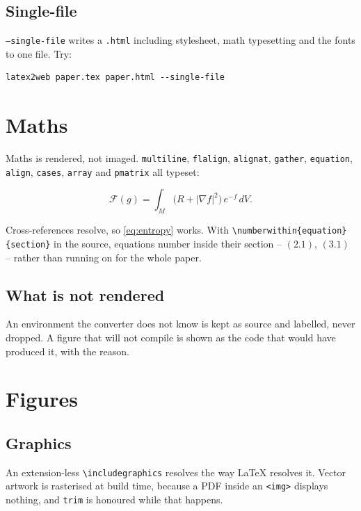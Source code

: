 \documentclass[11pt]{article}
\begin{document}
\subsection{Single-file}

\texttt{--single-file} writes a \texttt{.html} including stylesheet, math
typesetting and the fonts to one file. Try:

\begin{verbatim}
latex2web paper.tex paper.html --single-file
\end{verbatim}

\section{Maths}

Maths is rendered, not imaged. \texttt{multiline}, \texttt{flalign},
\texttt{alignat}, \texttt{gather}, \texttt{equation}, \texttt{align},
\texttt{cases}, \texttt{array} and \texttt{pmatrix} all typeset:

\begin{equation}\label{eq:entropy}
  \mathcal{F}(g) = \int_M \bigl(R + |\nabla f|^2\bigr)\,e^{-f}\,dV.
\end{equation}

Cross-references resolve, so \eqref{eq:entropy} works. With
\verb|\numberwithin{equation}{section}| in the source, equations number inside
their section -- $(2.1)$, $(3.1)$ -- rather than running on for the whole paper.

\subsection{What is not rendered}

An environment the converter does not know is kept as source and labelled, never
dropped. A figure that will not compile is shown as the code that would have
produced it, with the reason.

\section{Figures}

\subsection{Graphics}

An extension-less \texttt{\textbackslash includegraphics} resolves the way LaTeX
resolves it. Vector artwork is rasterised at build time, because a PDF inside an
\texttt{<img>} displays nothing, and \texttt{trim} is honoured while that happens.
\end{document}
